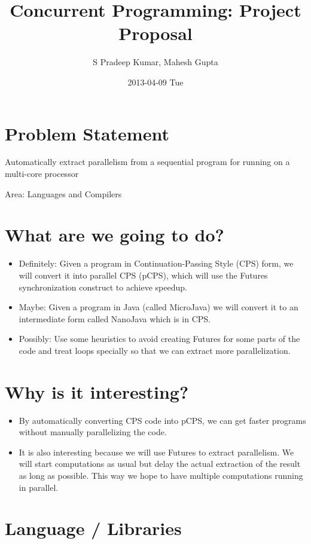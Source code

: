 \documentclass[10pt]{article}
\title{Concurrent Programming: Project Proposal}
\author{S Pradeep Kumar, Mahesh Gupta}
\date{2013-04-09 Tue}
\begin{document}
\maketitle


                               
\section*{Problem Statement}
\label{sec-1}

  Automatically extract parallelism from a sequential program for running on a multi-core processor

  Area: Languages and Compilers
\section*{What are we going to do?}
\label{sec-2}

\begin{itemize}
\item Definitely: Given a program in Continuation-Passing Style (CPS) form, we will convert it into parallel CPS (pCPS), which will use the Futures synchronization construct to achieve speedup.
\item Maybe: Given a program in Java (called MicroJava) we will convert it to an intermediate form called NanoJava which is in CPS.
\item Possibly: Use some heuristics to avoid creating Futures for some parts of the code and treat loops specially so that we can extract more parallelization.
\end{itemize}
\section*{Why is it interesting?}
\label{sec-3}

\begin{itemize}
\item By automatically converting CPS code into pCPS, we can get faster programs without manually parallelizing the code.
\item It is also interesting because we will use Futures to extract parallelism. We will start computations as usual but delay the actual extraction of the result as long as possible. This way we hope to have multiple computations running in parallel.
\end{itemize}
\section*{Language / Libraries}
\label{sec-4}
\end{document}
